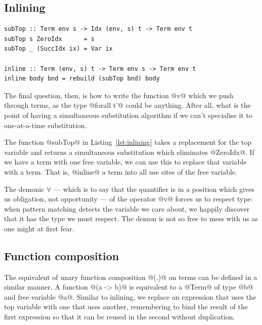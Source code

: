 \subsection{Inlining}
\label{sec:inlining}

\begin{lstlisting}[style=haskell_float
    ,label=lst:inlining
    ,caption={A simultaneous substitution to inline terms}]
subTop :: Term env s -> Idx (env, s) t -> Term env t
subTop s ZeroIdx      = s
subTop _ (SuccIdx ix) = Var ix

inline :: Term (env, s) t -> Term env s -> Term env t
inline body bnd = rebuild (subTop bnd) body
\end{lstlisting}

The final question, then, is how to write the function @v@ which we push
through terms, as the type @forall t'@ could be anything. After all, what
is the point of having a simultaneous substitution algorithm if we can't
specialise it to one-at-a-time substitution.

The function @subTop@ in Listing~\ref{lst:inlining} takes a replacement for the
top variable and returns a simultaneous substitution which eliminates @ZeroIdx@.
If we have a term with one free variable, we can use this to replace that
variable with a term. That is, @inline@ a term into all use sites of the free
variable.

The demonic $\forall$ --- which is to say that the quantifier is in a position
which gives us obligation, not opportunity --- of the operator @v@ forces
us to respect type: when pattern matching detects the variable we care about,
we happily discover that it has the type we must respect. The demon is not so
free to mess with us as one might at first fear.


\subsection{Function composition}
\label{sec:function_composition}

The equivalent of unary function composition @(.)@ on terms can be
defined in a similar manner. A function @(a -> b)@ is equivalent to a
@Term@ of type @b@ and free variable @a@. Similar to inlining, we
replace an expression that uses the top variable with one that uses another,
remembering to bind the result of the first expression so that it can be reused
in the second without duplication.

